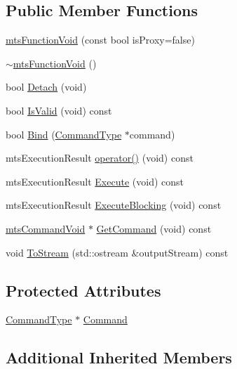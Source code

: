 \subsection*{Public Member Functions}
\begin{DoxyCompactItemize}
\item 
\hyperlink{classmts_function_void_ae83ab2874727476015fd013e8bc8fa3e}{mts\+Function\+Void} (const bool is\+Proxy=false)
\item 
\hyperlink{classmts_function_void_ae21d5d674eede40b132a5e34978e8137}{$\sim$mts\+Function\+Void} ()
\item 
bool \hyperlink{classmts_function_void_a1b129398698e60babfe28f4e82f778b1}{Detach} (void)
\item 
bool \hyperlink{classmts_function_void_a366d7b348e0fe6790067c6a5ab92f3f5}{Is\+Valid} (void) const 
\item 
bool \hyperlink{classmts_function_void_a03d9ae5c313a0464fac2fe99cd01be5f}{Bind} (\hyperlink{classmts_function_void_a76cc1c4742429e7cac7e4b73412f4cc9}{Command\+Type} $\ast$command)
\item 
mts\+Execution\+Result \hyperlink{classmts_function_void_aef53e6246e04936cd86021ff38ef13e3}{operator()} (void) const 
\item 
mts\+Execution\+Result \hyperlink{classmts_function_void_afdaa7e4b1247a986dc4bd54f1433cfd0}{Execute} (void) const 
\item 
mts\+Execution\+Result \hyperlink{classmts_function_void_a27c9f2b54e75a8b0ac1b9fc2b4acf766}{Execute\+Blocking} (void) const 
\item 
\hyperlink{classmts_command_void}{mts\+Command\+Void} $\ast$ \hyperlink{classmts_function_void_aee4d3326f9dd146aa565e0e3ce016068}{Get\+Command} (void) const 
\item 
void \hyperlink{classmts_function_void_a84d7f439003ba550206a265123d0fe16}{To\+Stream} (std\+::ostream \&output\+Stream) const 
\end{DoxyCompactItemize}
\subsection*{Protected Attributes}
\begin{DoxyCompactItemize}
\item 
\hyperlink{classmts_function_void_a76cc1c4742429e7cac7e4b73412f4cc9}{Command\+Type} $\ast$ \hyperlink{classmts_function_void_aa0384f1c3e204da6b625e520bbdef6c5}{Command}
\end{DoxyCompactItemize}
\subsection*{Additional Inherited Members}


